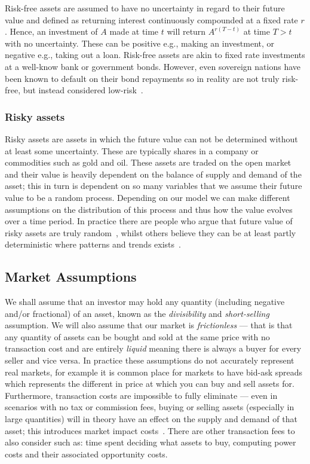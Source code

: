 Risk-free assets are assumed to have no uncertainty in regard to their future value and defined as returning interest continuously compounded at a fixed rate \(r\). Hence, an investment of \(A\) made at time \(t\) will return \(A^{r\left(T-t\right)}\) at time \(T>t\) with no uncertainty. These can be positive e.g., making an investment, or negative e.g., taking out a loan. Risk-free assets are akin to fixed rate investments at a well-know bank or government bonds. However, even sovereign nations have been known to default on their bond repayments so in reality are not truly risk-free, but instead considered low-risk~\cite{kitanov2015risk}.

\subsubsection{Risky assets}

Risky assets are assets in which the future value can not be determined without at least some uncertainty. These are typically shares in a company or commodities such as gold and oil. These assets are traded on the open market and their value is heavily dependent on the balance of supply and demand of the asset; this in turn is dependent on so many variables that we assume their future value to be a random process. Depending on our model we can make different assumptions on the distribution of this process and thus how the value evolves over a time period. In practice there are people who argue that future value of risky assets are truly random~\cite{RandomWalkFama}, whilst others believe they can be at least partly deterministic where patterns and trends exists~\cite{shiller}.

\subsection{Market Assumptions}

We shall assume that an investor may hold any quantity (including negative and/or fractional) of an asset, known as the \textit{divisibility} and \textit{short-selling} assumption. We will also assume that our market is \textit{frictionless} --- that is that any quantity of assets can be bought and sold at the same price with no transaction cost and are entirely \textit{liquid} meaning there is always a buyer for every seller and vice versa.
\nline{}
In practice these assumptions do not accurately represent real markets, for example it is common place for markets to have bid-ask spreads which represents the different in price at which you can buy and sell assets for. Furthermore, transaction costs are impossible to fully eliminate --- even in scenarios with no tax or commission fees, buying or selling assets (especially in large quantities) will in theory have an effect on the supply and demand of that asset; this introduces market impact costs~\cite{moro2009market}. There are other transaction fees to also consider such as: time spent deciding what assets to buy, computing power costs and their associated opportunity costs.

